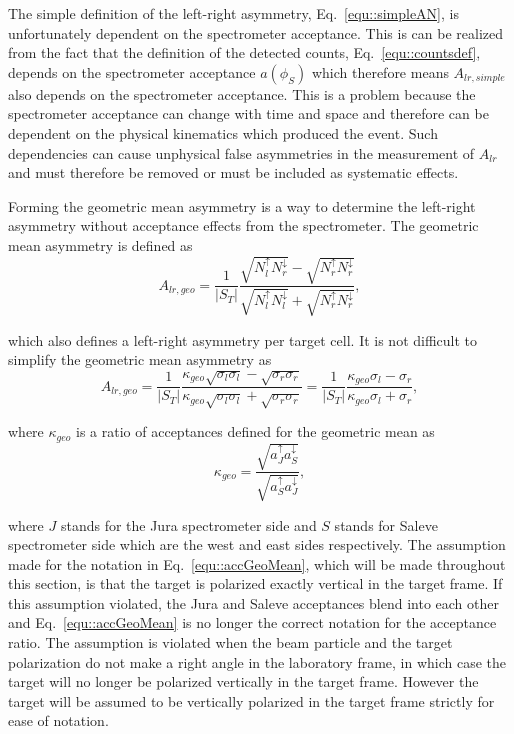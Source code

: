 The simple definition of the left-right asymmetry, Eq.~\ref{equ::simpleAN}, is
unfortunately dependent on the spectrometer acceptance.  This is can be realized
from the fact that the definition of the detected counts,
Eq.~\ref{equ::countsdef}, depends on the spectrometer acceptance $a(\phi_S)$
which therefore means $A_{lr,simple}$ also depends on the spectrometer
acceptance.  This is a problem because the spectrometer acceptance can change
with time and space and therefore can be dependent on the physical kinematics
which produced the event.  Such dependencies can cause unphysical false
asymmetries in the measurement of $A_{lr}$ and must therefore be removed or must
be included as systematic effects. \par

Forming the geometric mean asymmetry is a way to determine the left-right
asymmetry without acceptance effects from the spectrometer.  The geometric mean
asymmetry is defined as
\begin{equation}
  \label{equ::ANgeomean}
  A_{lr,geo} =
  \frac{1}{|S_T|}
  \frac{\sqrt{N_l^{\uparrow}N_r^{\downarrow}}
    - \sqrt{N_r^{\uparrow}N_r^{\downarrow}}
  }{
    \sqrt{N_l^{\uparrow}N_l^{\downarrow}}
    + \sqrt{N_r^{\uparrow}N_r^{\downarrow}} },
\end{equation}

\noindent
which also defines a left-right asymmetry per target cell.  It is not difficult
to simplify the geometric mean asymmetry as
\begin{equation}
  \label{equ::ANgeomean_expand}
  A_{lr,geo} = \frac{1}{|S_T|}\frac{\kappa_{geo}
    \sqrt{\sigma_l\sigma_l} -
    \sqrt{\sigma_r\sigma_r}}{\kappa_{geo}
    \sqrt{\sigma_l\sigma_l} + \sqrt{\sigma_r\sigma_r}}
  = \frac{1}{|S_T|}\frac{\kappa_{geo}\sigma_l - \sigma_r}{
    \kappa_{geo}\sigma_l + \sigma_r},
\end{equation}

\noindent
where $\kappa_{geo}$ is a ratio of acceptances defined for the geometric mean as
\begin{equation}
  \kappa_{geo} =
  \frac{
    \sqrt{a^\uparrow_J a^\downarrow_S}
    }{
    \sqrt{a^\uparrow_S a^\downarrow_J}
  },
  \label{equ::accGeoMean}
\end{equation}

\noindent
where $J$ stands for the Jura spectrometer side and $S$ stands for Saleve
spectrometer side which are the west and east sides respectively.  The
assumption made for the notation in Eq.~\ref{equ::accGeoMean}, which will be
made throughout this section, is that the target is polarized exactly vertical
in the target frame.  If this assumption violated, the Jura and Saleve
acceptances blend into each other and Eq.~\ref{equ::accGeoMean} is no longer the
correct notation for the acceptance ratio.  The assumption is violated when the
beam particle and the target polarization do not make a right angle in the
laboratory frame, in which case the target will no longer be polarized
vertically in the target frame.  However the target will be assumed to be
vertically polarized in the target frame strictly for ease of notation.


